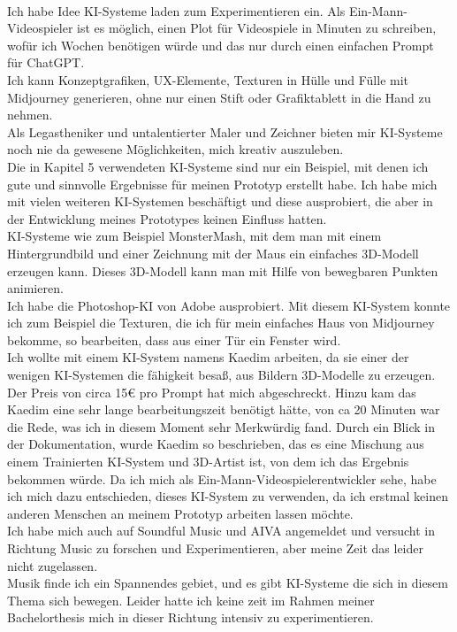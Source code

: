 \\
Ich habe Idee
KI-Systeme laden zum Experimentieren ein. Als Ein-Mann-Videospieler ist es möglich, einen Plot für Videospiele in Minuten zu schreiben, wofür ich Wochen benötigen würde und das nur durch einen einfachen Prompt für ChatGPT.
\\
Ich kann Konzeptgrafiken, UX-Elemente, Texturen in Hülle und Fülle mit Midjourney generieren, ohne nur einen Stift oder Grafiktablett in die Hand zu nehmen.
\\
Als Legastheniker und untalentierter Maler und Zeichner bieten mir KI-Systeme noch nie da gewesene Möglichkeiten, mich kreativ auszuleben.
\\
Die in Kapitel 5 verwendeten KI-Systeme sind nur ein Beispiel, mit denen ich gute und sinnvolle Ergebnisse für meinen Prototyp erstellt habe. Ich habe mich mit vielen weiteren KI-Systemen beschäftigt und diese ausprobiert, die aber in der Entwicklung meines Prototypes keinen Einfluss hatten.
\\
KI-Systeme wie zum Beispiel MonsterMash, mit dem man mit einem Hintergrundbild und einer Zeichnung mit der Maus ein einfaches 3D-Modell erzeugen kann. Dieses 3D-Modell kann man mit Hilfe von bewegbaren Punkten animieren.
\\
Ich habe die Photoshop-KI von Adobe ausprobiert. Mit diesem KI-System konnte ich zum Beispiel die Texturen, die ich für mein einfaches Haus von Midjourney bekomme, so bearbeiten, dass aus einer Tür ein Fenster wird.
\\
Ich wollte mit einem KI-System namens Kaedim arbeiten, da sie einer der wenigen KI-Systemen die fähigkeit besaß, aus Bildern 3D-Modelle zu erzeugen. Der Preis von circa 15€ pro Prompt hat mich abgeschreckt. Hinzu kam das Kaedim eine sehr lange bearbeitungszeit benötigt hätte, von ca 20 Minuten war die Rede, was ich in diesem Moment sehr Merkwürdig fand.
Durch ein Blick in der Dokumentation, wurde Kaedim so beschrieben, das es eine Mischung aus einem Trainierten KI-System und 3D-Artist ist, von dem ich das Ergebnis bekommen würde.
Da ich mich als Ein-Mann-Videospielerentwickler sehe, habe ich mich dazu entschieden, dieses KI-System zu verwenden, da ich erstmal keinen anderen Menschen an meinem Prototyp arbeiten lassen möchte.
\\
Ich habe mich auch auf Soundful Music und AIVA angemeldet und versucht in Richtung Music zu forschen und Experimentieren, aber meine Zeit das leider nicht zugelassen.
\\
Musik finde ich ein Spannendes gebiet, und es gibt KI-Systeme die sich in diesem Thema sich bewegen. Leider hatte ich keine zeit im Rahmen meiner Bachelorthesis mich in dieser Richtung intensiv zu experimentieren.
